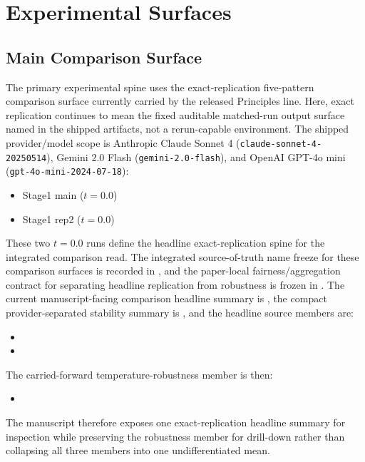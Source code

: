\documentclass[11pt,a4paper]{article}
\begin{document}
\section{Experimental Surfaces}
\label{sec:surfaces}

\subsection{Main Comparison Surface}

The primary experimental spine uses the exact-replication five-pattern comparison surface currently carried by the released Principles line. Here, exact replication continues to mean the fixed auditable matched-run output surface named in the shipped artifacts, not a rerun-capable environment. The shipped provider/model scope is Anthropic Claude Sonnet 4 (\texttt{claude-sonnet-4-20250514}), Gemini 2.0 Flash (\texttt{gemini-2.0-flash}), and OpenAI GPT-4o mini (\texttt{gpt-4o-mini-2024-07-18}):
\begin{itemize}
  \item Stage1 main (\(t=0.0\))
  \item Stage1 rep2 (\(t=0.0\))
\end{itemize}

These two \(t=0.0\) runs define the headline exact-replication spine for the integrated comparison read. The integrated source-of-truth name freeze for these comparison surfaces is recorded in , and the paper-local fairness/aggregation contract for separating headline replication from robustness is frozen in . The current manuscript-facing comparison headline summary is , the compact provider-separated stability summary is , and the headline source members are:
\begin{itemize}
  \item {}
  \item {}
\end{itemize}
The carried-forward temperature-robustness member is then:
\begin{itemize}
  \item {}
\end{itemize}
The manuscript therefore exposes one exact-replication headline summary for inspection while preserving the robustness member for drill-down rather than collapsing all three members into one undifferentiated mean.
\end{document}
